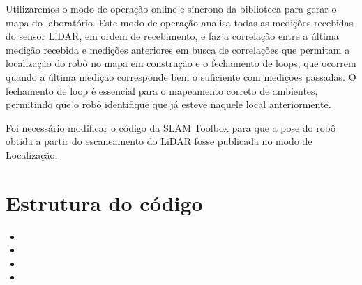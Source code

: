     Utilizaremos o modo de operação online e síncrono da biblioteca para gerar o mapa do laboratório. Este modo de operação analisa todas as medições recebidas do sensor LiDAR, em ordem de recebimento, e faz a correlação entre a última medição recebida e medições anteriores em busca de correlações que permitam a localização do robô no mapa em construção e o fechamento de loops, que ocorrem quando a última medição corresponde bem o suficiente com medições passadas. O fechamento de loop é essencial para o mapeamento correto de ambientes, permitindo que o robô identifique que já esteve naquele local anteriormente.

    
    


    Foi necessário modificar o código da SLAM Toolbox para que a pose do robô obtida a partir do escaneamento do LiDAR fosse publicada no modo de Localização.

\section{Estrutura do código}

\begin{itemize}
    \item {}
    \item {}
    \item {}
    \item {}
\end{itemize}



